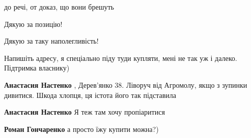 \begin{itemize}
\begin{itemize}
до речі, от доказ, що вони брешуть
\end{itemize}

 
Дякую за позицію!

 
Дякую за таку наполегливість!

 
Напишіть адресу, я спеціально піду туди купляти, мені не так уж і далеко. Підтримка власнику)

\begin{itemize}
 
\textbf{Анастасия Настенко} , Дерев'янко 38. Ліворуч від Агромолу, якщо з зупинки дивитися. Шкода хлопця, ця істота його так підставила

 
\textbf{Анастасия Настенко} Я теж там хочу пропіаритися

 
\textbf{Роман Гончаренко} а просто їжу купити можна?)


\end{itemize}
\end{itemize}
